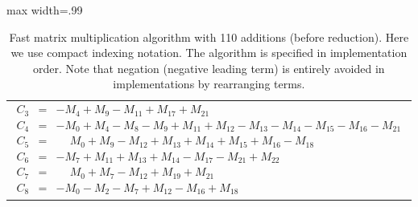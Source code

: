 \documentclass{article}
\begin{document}
\begin{table}[ht!]
\begin{adjustbox}{max width=.99\textwidth}
\begin{tabularx}{\textwidth}{X}
\begin{eqnarray*}
C_{3} &=& -M_{4}+M_{9}-M_{11}+M_{17}+M_{21}\\
C_{4} &=& -M_{0}+M_{4}-M_{8}-M_{9}+M_{11}+M_{12}-M_{13}-M_{14}-M_{15}-M_{16}-M_{21}\\
C_{5} &=& \phantom{-}M_{0}+M_{9}-M_{12}+M_{13}+M_{14}+M_{15}+M_{16}-M_{18}\\
C_{6} &=& -M_{7}+M_{11}+M_{13}+M_{14}-M_{17}-M_{21}+M_{22}\\
C_{7} &=& \phantom{-}M_{0}+M_{7}-M_{12}+M_{19}+M_{21}\\
C_{8} &=& -M_{0}-M_{2}-M_{7}+M_{12}-M_{16}+M_{18}
\end{eqnarray*}
\end{tabularx}
\end{adjustbox}
    \caption{Fast matrix multiplication algorithm with 110 additions (before reduction). Here we use compact indexing notation. The algorithm is specified in implementation order. Note that negation (negative leading term) is entirely avoided in implementations by rearranging terms.}
    \label{tab:stapleton_59_before}
\end{table}
\end{document}
